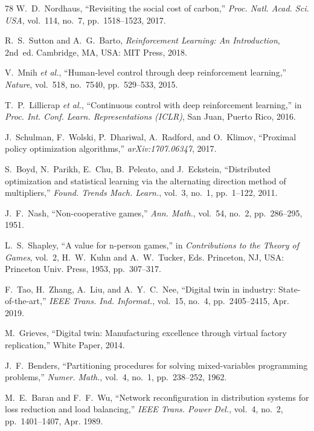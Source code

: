 \documentclass[journal]{IEEEtran}
\begin{document}
\begin{thebibliography}{78}
 W.~D.~Nordhaus, ``Revisiting the social cost of carbon,'' \textit{Proc. Natl. Acad. Sci. USA}, vol.~114, no.~7, pp.~1518--1523, 2017.

 R.~S.~Sutton and A.~G.~Barto, \textit{Reinforcement Learning: An Introduction}, 2nd~ed. Cambridge, MA, USA: MIT Press, 2018.

 V.~Mnih \textit{et al.}, ``Human-level control through deep reinforcement learning,'' \textit{Nature}, vol.~518, no.~7540, pp.~529--533, 2015.

 T.~P.~Lillicrap \textit{et al.}, ``Continuous control with deep reinforcement learning,'' in \textit{Proc. Int. Conf. Learn. Representations (ICLR)}, San Juan, Puerto Rico, 2016.

 J.~Schulman, F.~Wolski, P.~Dhariwal, A.~Radford, and O.~Klimov, ``Proximal policy optimization algorithms,'' \textit{arXiv:1707.06347}, 2017.

 S.~Boyd, N.~Parikh, E.~Chu, B.~Peleato, and J.~Eckstein, ``Distributed optimization and statistical learning via the alternating direction method of multipliers,'' \textit{Found. Trends Mach. Learn.}, vol.~3, no.~1, pp.~1--122, 2011.

 J.~F.~Nash, ``Non-cooperative games,'' \textit{Ann. Math.}, vol.~54, no.~2, pp.~286--295, 1951.

 L.~S.~Shapley, ``A value for n-person games,'' in \textit{Contributions to the Theory of Games}, vol.~2, H.~W.~Kuhn and A.~W.~Tucker, Eds. Princeton, NJ, USA: Princeton Univ. Press, 1953, pp.~307--317.

 F.~Tao, H.~Zhang, A.~Liu, and A.~Y.~C.~Nee, ``Digital twin in industry: State-of-the-art,'' \textit{IEEE Trans. Ind. Informat.}, vol.~15, no.~4, pp.~2405--2415, Apr. 2019.

 M.~Grieves, ``Digital twin: Manufacturing excellence through virtual factory replication,'' White Paper, 2014.

 J.~F.~Benders, ``Partitioning procedures for solving mixed-variables programming problems,'' \textit{Numer. Math.}, vol.~4, no.~1, pp.~238--252, 1962.

 M.~E.~Baran and F.~F.~Wu, ``Network reconfiguration in distribution systems for loss reduction and load balancing,'' \textit{IEEE Trans. Power Del.}, vol.~4, no.~2, pp.~1401--1407, Apr. 1989.


\end{thebibliography}
\end{document}
